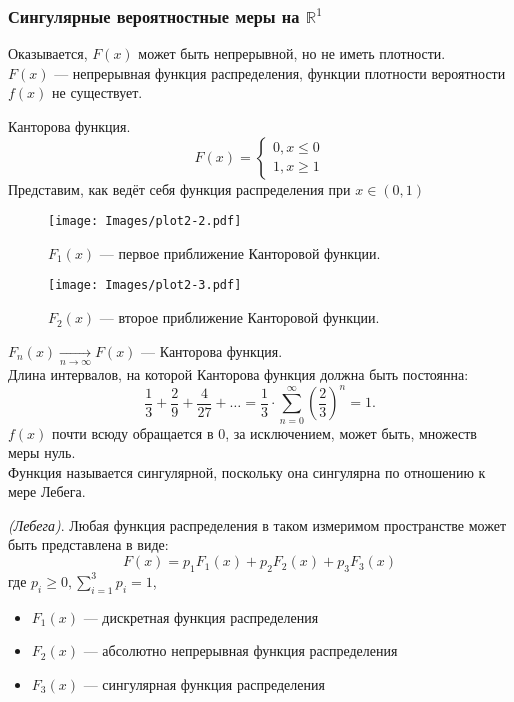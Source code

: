 \subsubsection{Сингулярные вероятностные меры на $\mathbb{R}^1$}
Оказывается, $F(x)$ может быть непрерывной, но не иметь плотности. \\
$F(x)$ --- непрерывная функция распределения, функции плотности вероятности $f(x)$ не существует.
\begin{example} Канторова функция.
	\[
		F(x) =
		\begin{cases}
			0, x \leqslant 0 \\
			1, x \geqslant 1
		\end{cases}
	\]
	Представим, как ведёт себя функция распределения при $x \in (0, 1)$




	

	\begin{figure}[H]
	\begin{center}
	\texttt{[image: Images/plot2-2.pdf]}
	\end{center}
	\caption{$F_1(x)$ --- первое приближение Канторовой функции.}
	\end{figure}
	\begin{figure}[H]
	\begin{center}
	\texttt{[image: Images/plot2-3.pdf]}
	\end{center}
	\caption{$F_2(x)$ --- второе приближение Канторовой функции.}
	\end{figure}

	$F_n(x) \underset{n \to \infty}{\rightarrow} F(x)$ --- Канторова функция. \\
	Длина интервалов, на которой Канторова функция должна быть постоянна:
	\[
		\frac{1}{3} + \frac{2}{9} + \frac{4}{27} + \ldots = \frac{1}{3} \cdot \sum\limits_{n = 0}^\infty \left(\frac{2}{3}\right)^n = 1.
	\]
	$f(x)$ почти всюду обращается в 0, за исключением, может быть, множеств меры нуль. \\
	Функция называется сингулярной, поскольку она сингулярна по отношению к мере Лебега.
\end{example}
\begin{theorem} \textit{(Лебега)}.  
	Любая функция распределения в таком измеримом пространстве может быть представлена в виде:
	\[
		F(x) = p_1 F_1(x) + p_2 F_2(x) + p_3 F_3(x)
	\]
	где $p_i \geqslant 0, \sum\limits_{i=1}^3 p_i = 1$,
	\begin{itemize}
		\item $F_1 (x)$ --- дискретная функция распределения
		\item $F_2 (x)$ --- абсолютно непрерывная функция распределения
		\item $F_3 (x)$ --- сингулярная функция распределения
	\end{itemize}
\end{theorem}

